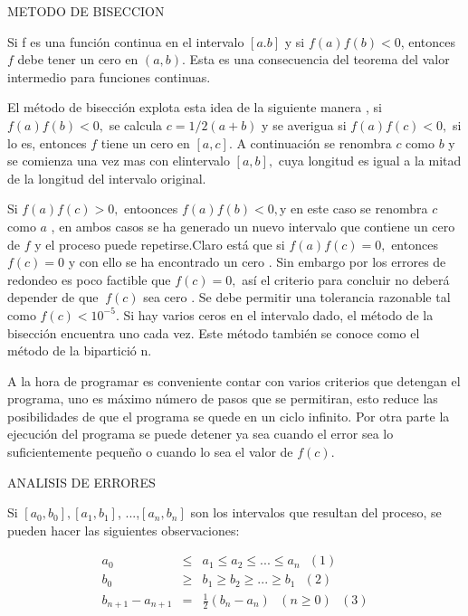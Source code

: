 \documentclass{article}
\begin{document}
METODO DE BISECCION

\bigskip 

Si f es una funci\'{o}n continua en el intervalo $\left[ a.b\right] $ y si $%
f\left( a\right) f\left( b\right) <0$, entonces $f$ debe tener un cero en $%
\left( a,b\right) .$ Esta es una consecuencia del teorema del valor
intermedio para funciones continuas. 

El m\'{e}todo de bisecci\'{o}n explota esta idea de la siguiente manera , si 
$f\left( a\right) f\left( b\right) <0,$ se calcula $c=1/2(a+b)$ y se
averigua si $f\left( a\right) f\left( c\right) <0,$ si lo es, entonces $f$
tiene un cero en $\left[ a,c\right] .$ A continuaci\'{o}n se renombra $c$
como $b$ y se comienza una vez mas con elintervalo $\left[ a,b\right] ,$
cuya longitud es igual a la mitad de la longitud del intervalo original.

Si $f\left( a\right) f\left( c\right) >0,$ entoonces $f\left( a\right)
f\left( b\right) <0,$y en este caso se renombra $c$ como $a$ , en ambos
casos se ha generado un nuevo intervalo que contiene un cero de $f$ y el
proceso puede repetirse.Claro est\'{a} que si $f\left( a\right) f\left(
c\right) =0,$ entonces $f\left( c\right) =0$ y con ello se ha encontrado un
cero . Sin embargo por los errores de redondeo es poco factible que $f\left(
c\right) =0,$ as\'{i} el criterio para concluir no deber\'{a} depender de
que $\ f\left( c\right) $ sea cero . Se debe permitir una tolerancia
razonable tal como $f\left( c\right) <10^{-5}.$ Si hay varios ceros en el
intervalo dado, el m\'{e}todo de la bisecci\'{o}n encuentra uno cada vez.
Este m\'{e}todo tambi\'{e}n se conoce como el m\'{e}todo de la bipartici\'{o}%
n.

\bigskip 

A la hora de programar es conveniente contar con varios criterios que
detengan el programa, uno es m\'{a}ximo  n\'{u}mero de pasos que se
permitiran, esto reduce las posibilidades de que el programa se quede en un
ciclo infinito. Por otra parte la ejecuci\'{o}n del programa se puede
detener ya sea cuando el error sea lo suficientemente peque\~{n}o o cuando
lo sea el valor de $f\left( c\right) .$

\bigskip 

ANALISIS DE ERRORES

\bigskip Si $\left[ a_{0},b_{0}\right] ,\left[ a_{1},b_{1}\right] $, ...,$%
\left[ a_{n},b_{n}\right] $ son los intervalos que resultan del proceso, se
pueden hacer las siguientes observaciones:

\begin{eqnarray*}
a_{0} &\leqslant &a_{1}\leqslant a_{2}\leqslant ...\leqslant a_{n}\text{ }%
\left( 1\right)  \\
b_{0} &\geqslant &b_{1}\geqslant b_{2}\geqslant ...\geqslant b_{1}\text{ }%
\left( 2\right)  \\
b_{n+1}-a_{n+1} &=&\frac{1}{2}\left( b_{n}-a_{n}\right) \text{ \ \ }\left(
n\geqslant 0\right) \text{ }\left( 3\right) 
\end{eqnarray*}
\end{document}
